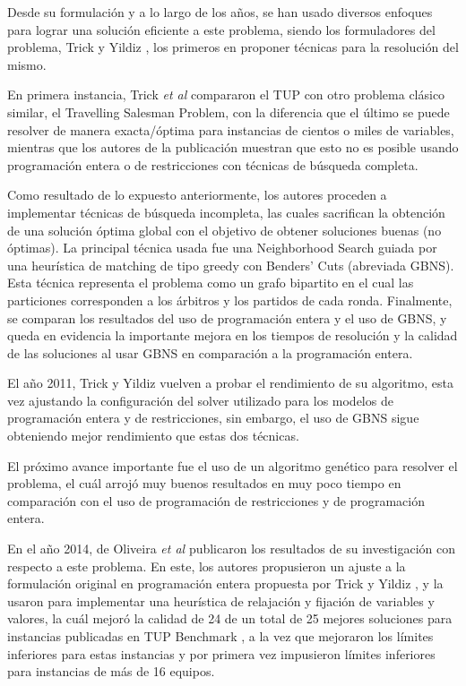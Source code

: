 \documentclass[letter, 10pt]{article}
\begin{document}
Desde su formulaci\'on y a lo largo de los a\~nos, se han usado diversos enfoques para lograr una soluci\'on eficiente a este problema, siendo los formuladores del problema, Trick y Yildiz \cite{trick_2007}, los primeros en proponer t\'ecnicas para la resoluci\'on del mismo.

En primera instancia, Trick \emph{et al} \cite{trick_2007} compararon el TUP con otro problema cl\'asico similar, el Travelling Salesman Problem, con la diferencia que el \'ultimo se puede resolver de manera exacta/\'optima para instancias de cientos o miles de variables, mientras que los autores de la publicaci\'on muestran que esto no es posible usando programaci\'on entera o de restricciones con t\'ecnicas de b\'usqueda completa.

Como resultado de lo expuesto anteriormente, los autores proceden a implementar t\'ecnicas de b\'usqueda incompleta, las cuales sacrifican la obtenci\'on de una soluci\'on \'optima global con el objetivo de obtener soluciones buenas (no \'optimas). La principal t\'ecnica usada fue una Neighborhood Search guiada por una heur\'istica de matching de tipo greedy con Benders' Cuts (abreviada GBNS). Esta t\'ecnica representa el problema como un grafo bipartito en el cual las particiones corresponden a los \'arbitros y los partidos de cada ronda. Finalmente, se comparan los resultados del uso de programaci\'on entera y el uso de GBNS, y queda en evidencia la importante mejora en los tiempos de resoluci\'on y la calidad de las soluciones al usar GBNS en comparaci\'on a la programaci\'on entera. \cite{trick_2007}

El a\~no 2011, Trick y Yildiz vuelven a probar el rendimiento de su algoritmo, esta vez ajustando la configuraci\'on del solver utilizado para los modelos de programaci\'on entera y de restricciones, sin embargo, el uso de GBNS sigue obteniendo mejor rendimiento que estas dos t\'ecnicas. \cite{trick_yildiz_2011}

El pr\'oximo avance importante fue el uso de un algoritmo gen\'etico para resolver el problema, el cu\'al arroj\'o muy buenos resultados en muy poco tiempo en comparaci\'on con el uso de programaci\'on de restricciones y de programaci\'on entera. \cite{TRICK2012286}

En el a\~no 2014, de Oliveira \emph{et al} \cite{DEOLIVEIRA2014592} publicaron los resultados de su investigaci\'on con respecto a este problema. En este, los autores propusieron un ajuste a la formulaci\'on original en programaci\'on entera propuesta por Trick y Yildiz \cite{trick_2007}, y la usaron para implementar una heur\'istica de relajaci\'on y fijaci\'on de variables y valores, la cu\'al mejor\'o la calidad de 24 de un total de 25 mejores soluciones para instancias publicadas en TUP Benchmark \cite{TUP_Website}, a la vez que mejoraron los l\'imites inferiores para estas instancias y por primera vez impusieron l\'imites inferiores para instancias de m\'as de 16 equipos. \cite{DEOLIVEIRA2014592}
\end{document}
